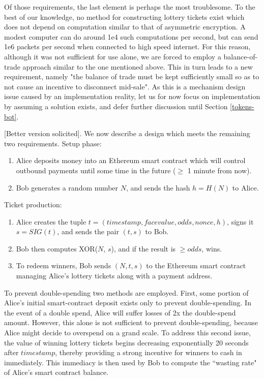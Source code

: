 \documentclass{article}
\begin{document}
Of those requirements, the last element is perhaps the most troublesome. To the best of our knowledge, no method for constructing lottery tickets exist which does not depend on computation similar to that of asymmetric encryption. A modest computer can do around 1e4 such computations per second, but can send 1e6 packets per second when connected to high speed internet. For this reason, although it was not sufficient for use alone, we are forced to employ a balance-of-trade approach similar to the one mentioned above. This in turn leads to a new requirement, namely "the balance of trade must be kept sufficiently small so as to not cause an incentive to disconnect mid-sale". As this is a mechanism design issue caused by an implementation reality, let us for now focus on implementation by assuming a solution exists, and defer further discussion until Section \ref{tokens-bot}.

[Better version solicited]. We now describe a design which meets the remaining two requirements. Setup phase:

\begin{enumerate}
    \item Alice deposits money into an Ethereum smart contract which will control outbound payments until some time in the future ($\geq$ 1 minute from now).
    \item Bob generates a random number $N$, and sends the hash $h=H(N)$ to Alice.
\end{enumerate}

Ticket production:

\begin{enumerate}
    \item Alice creates the tuple $t = (timestamp, face value, odds, nonce, h)$, signs it $s = SIG(t)$, and sends the pair $(t, s)$ to Bob.
    \item Bob then computes XOR($N$, $s$), and if the result is $\geq odds$, wins.
    \item To redeem winners, Bob sends $(N, t, s)$ to the Ethereum smart contract managing Alice's lottery tickets along with a payment address.
\end{enumerate}

To prevent double-spending two methods are employed. First, some portion of Alice's initial smart-contract deposit exists only to prevent double-spending. In the event of a double spend, Alice will suffer losses of 2x the double-spend amount. However, this alone is not sufficient to prevent double-spending, because Alice might decide to overspend on a grand scale. To address this second issue, the value of winning lottery tickets begins decreasing exponentially 20 seconds after $timestamp$, thereby providing a strong incentive for winners to cash in immediately. This immediacy is then used by Bob to compute the ``wasting rate" of Alice's smart contract balance.
\end{document}
